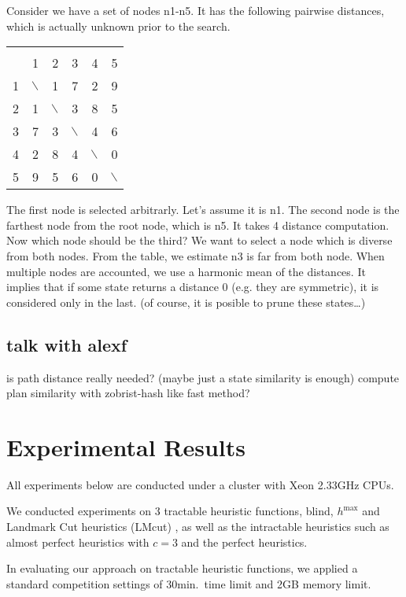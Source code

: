 Consider we have a set of nodes n1-n5. It has the following
pairwise distances, which is actually unknown prior to the search.

\begin{center}
\begin{tabular}{r|rrrrr|}
 &  &  &  &  & \\
 & 1 & 2 & 3 & 4 & 5\\
\hline
1 & $\backslash$ & 1 & 7 & 2 & 9\\
2 & 1 & $\backslash$ & 3 & 8 & 5\\
3 & 7 & 3 & $\backslash$ & 4 & 6\\
4 & 2 & 8 & 4 & $\backslash$ & 0\\
5 & 9 & 5 & 6 & 0 & $\backslash$\\
\hline
\end{tabular}
\end{center}

The first node is selected arbitrarly. Let's assume it is n1.
The second node is the farthest node from the root node, which is n5. It
takes 4 distance computation.
Now which node should be the third?
We want to select a node which is diverse from both nodes.
From the table, we estimate n3 is far from both node.
When multiple nodes are accounted, we use a harmonic mean of the distances.
It implies that if some state returns a distance 0 (e.g. they are
symmetric), it is considered only in the last. (of course, it is posible to
prune these states\ldots{})
\subsection{talk with alexf}
\label{sec-2-2}

is path distance really needed? (maybe just a state similarity is enough)
compute plan similarity with zobrist-hash like fast method?

\section{Experimental Results}
\label{sec-3}

All experiments below are conducted under a cluster with Xeon 2.33GHz CPUs.

We conducted experiments on 3 tractable heuristic functions, blind, $h^{\mbox{max}}$ and Landmark Cut heuristics (LMcut) \cite{Helmert2009}, as well as the intractable heuristics such as almost perfect heuristics with $c=3$ and the perfect heuristics.

In evaluating our approach on tractable heuristic functions, we applied a standard competition settings of 30min.\ time limit and 2GB memory limit.

